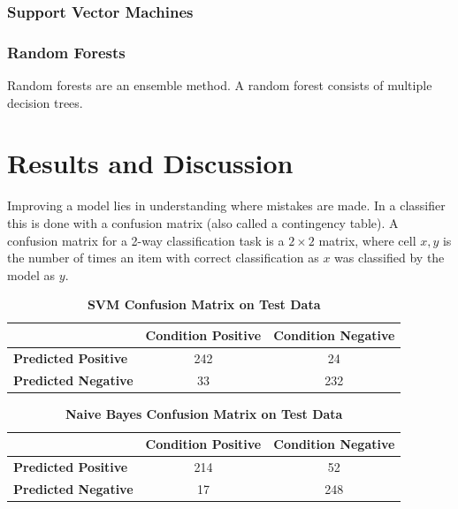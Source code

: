 \documentclass[10pt,letterpaper]{article}
\begin{document}
	\subsubsection*{Support Vector Machines}
	
	\subsubsection*{Random Forests}
	Random forests are an ensemble method. A random forest consists of multiple decision trees. 
	
	
	\section*{Results and Discussion}
	
	Improving a model lies in understanding where mistakes are made. In a classifier this is done with a confusion matrix (also called a contingency table). A confusion matrix for a 2-way classification task is a $2 \times 2$ matrix, where cell $x,y$ is the number of times an item with correct classification as $x$ was classified by the model as $y$. 

	\begin{table}[!ht]
		\centering
		\caption{{\bf SVM Confusion Matrix on Test Data}}
		\label{tab:conf-svm}
		\begin{tabular}{lcc}
		\hline
		& \multicolumn{1}{l}{\textbf{Condition Positive}} & \multicolumn{1}{l}{\textbf{Condition Negative}} \\ \hline
		\textbf{Predicted Positive} & 242                                             & 24                                              \\
		\textbf{Predicted Negative} & 33                                              & 232                                             \\ \hline
		\end{tabular}
	\end{table}

	\begin{table}[!ht]
		\centering
		\caption{{\bf Naive Bayes Confusion Matrix on Test Data}}
		\label{tab:conf-nb}
		\begin{tabular}{@{}lcc@{}}
			\toprule
			& \multicolumn{1}{l}{\textbf{Condition Positive}} & \multicolumn{1}{l}{\textbf{Condition Negative}} \\ \midrule
			\textbf{Predicted Positive} & 214                                             & 52                                              \\
			\textbf{Predicted Negative} & 17                                              & 248                                             \\ \bottomrule
		\end{tabular}
	\end{table}
			
\end{document}
